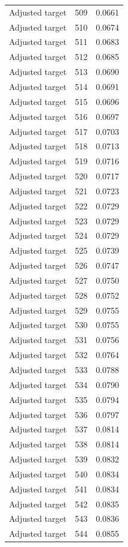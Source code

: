 \begin{table}[htbp]
\begin{tabular}{lll}
Adjusted target & 509 & 0.0661 \\
Adjusted target & 510 & 0.0674 \\
Adjusted target & 511 & 0.0683 \\
Adjusted target & 512 & 0.0685 \\
Adjusted target & 513 & 0.0690 \\
Adjusted target & 514 & 0.0691 \\
Adjusted target & 515 & 0.0696 \\
Adjusted target & 516 & 0.0697 \\
Adjusted target & 517 & 0.0703 \\
Adjusted target & 518 & 0.0713 \\
Adjusted target & 519 & 0.0716 \\
Adjusted target & 520 & 0.0717 \\
Adjusted target & 521 & 0.0723 \\
Adjusted target & 522 & 0.0729 \\
Adjusted target & 523 & 0.0729 \\
Adjusted target & 524 & 0.0729 \\
Adjusted target & 525 & 0.0739 \\
Adjusted target & 526 & 0.0747 \\
Adjusted target & 527 & 0.0750 \\
Adjusted target & 528 & 0.0752 \\
Adjusted target & 529 & 0.0755 \\
Adjusted target & 530 & 0.0755 \\
Adjusted target & 531 & 0.0756 \\
Adjusted target & 532 & 0.0764 \\
Adjusted target & 533 & 0.0788 \\
Adjusted target & 534 & 0.0790 \\
Adjusted target & 535 & 0.0794 \\
Adjusted target & 536 & 0.0797 \\
Adjusted target & 537 & 0.0814 \\
Adjusted target & 538 & 0.0814 \\
Adjusted target & 539 & 0.0832 \\
Adjusted target & 540 & 0.0834 \\
Adjusted target & 541 & 0.0834 \\
Adjusted target & 542 & 0.0835 \\
Adjusted target & 543 & 0.0836 \\
Adjusted target & 544 & 0.0855 \\

\end{tabular}
\end{table}
